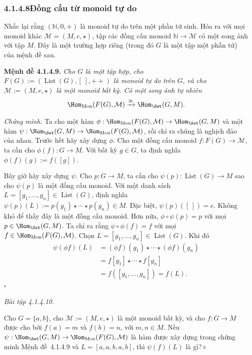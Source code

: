 \subsubsection*{4.1.4.8\quad Đồng cấu từ monoid tự do}

Nhắc lại rằng $(\mathbb{N},0,+)$ là monoid tự do trên một phần tử sinh. Hóa ra với mọi monoid khác $\mathcal{M}=(M,e,\star)$, tập các đồng cấu monoid $\mathbb{N}\to\mathcal{M}$ có một song ánh với tập $M$. Đây là một trường hợp riêng (trong đó $G$ là một tập một phần tử) của mệnh đề sau.

\noindent\textbf{Mệnh đề 4.1.4.9.} \emph{Cho $G$ là một tập hợp, cho $F(G):=(\operatorname{List}(G),[\ ],\mathbin{+\!+})$ là monoid tự do trên $G$, và cho $\mathcal{M}:=(M,e,\star)$ là một monoid bất kỳ. Có một song ánh tự nhiên}
\[
\Hom_{\mathrm{Mon}}(F(G),\mathcal{M})\xrightarrow{\cong}\Hom_{\Set}(G,M).
\]

\noindent\textit{Chứng minh.} Ta cho một hàm $\phi:\Hom_{\mathrm{Mon}}(F(G),\mathcal{M})\to\Hom_{\Set}(G,M)$ và một hàm $\psi:\Hom_{\Set}(G,M)\to\Hom_{\mathrm{Mon}}(F(G),\mathcal{M})$, rồi chỉ ra chúng là nghịch đảo của nhau. Trước hết hãy xây dựng $\phi$. Cho một đồng cấu monoid $f:F(G)\to\mathcal{M}$, ta cần cho $\phi(f):G\to M$. Với bất kỳ $g\in G$, ta định nghĩa $\phi(f)(g):=f([g])$.

Bây giờ hãy xây dựng $\psi$. Cho $p:G\to M$, ta cần cho $\psi(p):\operatorname{List}(G)\to M$ sao cho $\psi(p)$ là một đồng cấu monoid. Với một danh sách $L=[g_1,\ldots,g_n]\in\operatorname{List}(G)$, định nghĩa $\psi(p)(L):=p(g_1)\star\cdots\star p(g_n)\in M$. Đặc biệt, $\psi(p)([\ ])=e$. Không khó để thấy đây là một đồng cấu monoid. Hơn nữa, $\phi\circ\psi(p)=p$ với mọi $p\in\Hom_{\Set}(G,M)$. Ta chỉ ra rằng $\psi\circ\phi(f)=f$ với mọi $f\in\Hom_{\mathrm{Mon}}(F(G),\mathcal{M})$. Chọn $L=[g_1,\ldots,g_n]\in\operatorname{List}(G)$. Khi đó
\begin{align*}
\psi(\phi f)(L)
&=(\phi f)(g_1)\star\cdots\star(\phi f)(g_n)\\
&=f[g_1]\star\cdots\star f[g_n]\\
&=f([g_1,\ldots,g_n])=f(L).
\end{align*}
\hfill$\square$

\noindent\textit{Bài tập 4.1.4.10.}\keepwithnext

Cho $G=\{a,b\}$, cho $\mathcal{M}:=(M,e,\star)$ là một monoid bất kỳ, và cho $f:G\to M$ được cho bởi $f(a)=m$ và $f(b)=n$, với $m,n\in M$. Nếu $\psi:\Hom_{\Set}(G,M)\to\Hom_{\mathrm{Mon}}(F(G),\mathcal{M})$ là hàm được xây dựng trong chứng minh Mệnh đề~4.1.4.9 và $L=[a,a,b,a,b]$, thì $\psi(f)(L)$ là gì?\hfill$\diamond$
